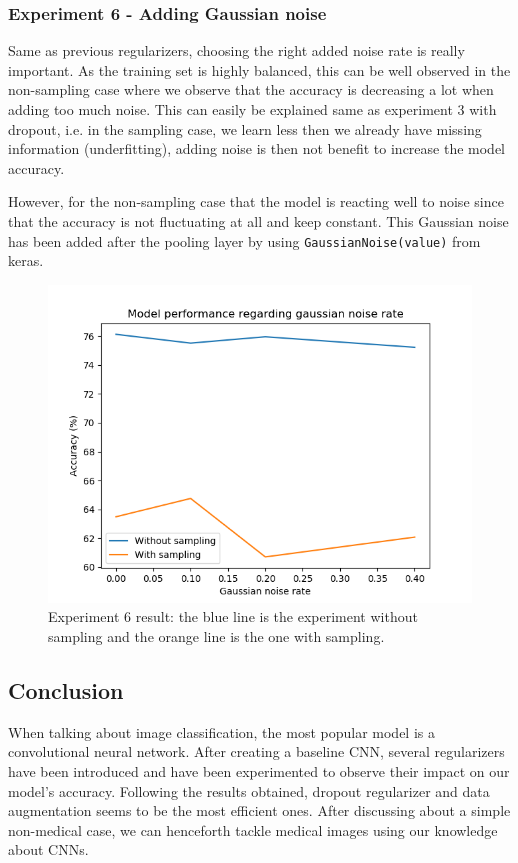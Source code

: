 \documentclass[11pt, openany]{report}
\theoremstyle{plain}
\theoremstyle{definition}
\theoremstyle{remark}
\begin{document}
\subsubsection{Experiment 6 - Adding Gaussian noise} \label{sec:noise-CIFAR10}
Same as previous regularizers, choosing the right added noise rate is really important. As the training set is highly balanced, this can be well observed in the non-sampling case where we observe that the accuracy is decreasing a lot when adding too much noise. This can easily be explained same as experiment 3 with dropout, i.e. in the sampling case, we learn less then we already have missing information (underfitting), adding noise is then not benefit to increase the model accuracy.

However, for the non-sampling case that the model is reacting well to noise since that the accuracy is not fluctuating at all and keep constant. This Gaussian noise has been added after the pooling layer by using \texttt{GaussianNoise(value)} from keras.   

\begin{figure}[H]
  \centering
  \includegraphics[scale=0.6]{Code/ch5-ModelPrototype/figures_result/gaussian_noise_graph.png}
  \caption{Experiment 6 result: the blue line is the experiment without sampling and the orange line is the one with sampling.}
  \label{fig:cifar_noise_res}
\end{figure}


\subsection{Conclusion}
When talking about image classification, the most popular model is a convolutional neural network. After creating a baseline CNN, several regularizers have been introduced and have been experimented to observe their impact on our model's accuracy. Following the results obtained, dropout regularizer and data augmentation seems to be the most efficient ones. After discussing about a simple non-medical case, we can henceforth tackle medical images using our knowledge about CNNs. 
\end{document}
